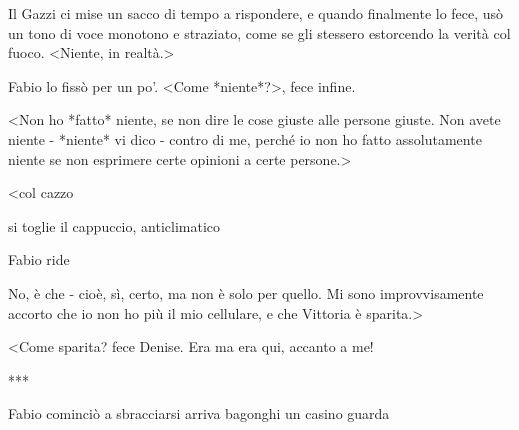 Il Gazzi ci mise un sacco di tempo a rispondere, e quando finalmente lo fece, usò un tono di voce monotono e straziato, come se gli stessero estorcendo la verità col fuoco. <Niente, in realtà.>

Fabio lo fissò per un po'. <Come *niente*?>, fece infine.

<Non ho *fatto* niente, se non dire le cose giuste alle persone giuste. Non avete niente - *niente* vi dico - contro di me, perché io non ho fatto assolutamente niente se non esprimere certe opinioni a certe persone.>

<col cazzo

si toglie il cappuccio, anticlimatico

Fabio ride

No, è che - cioè, sì, certo, ma non è solo per quello. Mi sono improvvisamente accorto che io non ho più il mio cellulare, e che Vittoria è sparita.>

<Come sparita? fece Denise. Era ma era qui, accanto a me!



***

Fabio cominciò a sbracciarsi
arriva bagonghi un casino guarda
